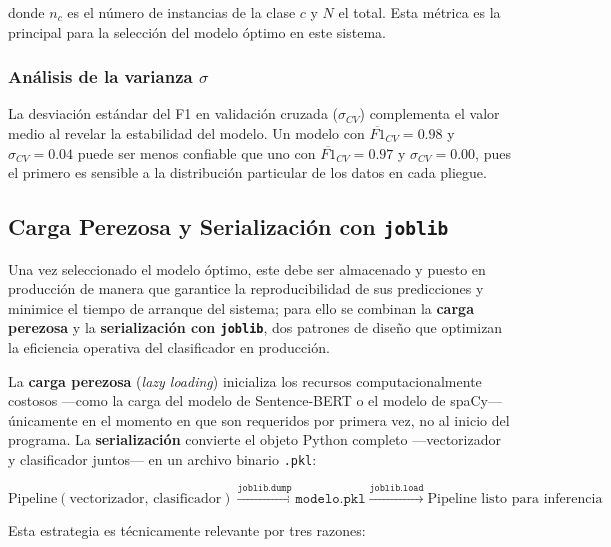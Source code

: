 donde $n_c$ es el número de instancias de la clase $c$ y $N$ el total. Esta
métrica es la principal para la selección del modelo óptimo en este sistema.

\subsubsection*{Análisis de la varianza $\sigma$}

La desviación estándar del F1 en validación cruzada ($\sigma_{CV}$) complementa
el valor medio al revelar la estabilidad del modelo. Un modelo con
$\overline{F1}_{CV} = 0.98$ y $\sigma_{CV} = 0.04$ puede ser menos confiable
que uno con $\overline{F1}_{CV} = 0.97$ y $\sigma_{CV} = 0.00$, pues el
primero es sensible a la distribución particular de los datos en cada pliegue.

\subsection{Carga Perezosa y Serialización con \texttt{joblib}}

Una vez seleccionado el modelo óptimo, este debe ser almacenado y puesto en
producción de manera que garantice la reproducibilidad de sus predicciones y
minimice el tiempo de arranque del sistema; para ello se combinan la
\textbf{carga perezosa} y la \textbf{serialización con \texttt{joblib}}, dos
patrones de diseño que optimizan la eficiencia operativa del clasificador en
producción.

La \textbf{carga perezosa} (\textit{lazy loading}) inicializa los recursos
computacionalmente costosos —como la carga del modelo de Sentence-BERT o el
modelo de spaCy— únicamente en el momento en que son requeridos por primera vez,
no al inicio del programa. La \textbf{serialización} convierte el objeto Python
completo —vectorizador y clasificador juntos— en un archivo binario
\texttt{.pkl}:

\begin{equation*}
  \text{Pipeline}(\text{vectorizador},\, \text{clasificador})
  \xrightarrow{\texttt{joblib.dump}}
  \texttt{modelo.pkl}
  \xrightarrow{\texttt{joblib.load}}
  \text{Pipeline listo para inferencia}
\end{equation*}

Esta estrategia es técnicamente relevante por tres razones:

